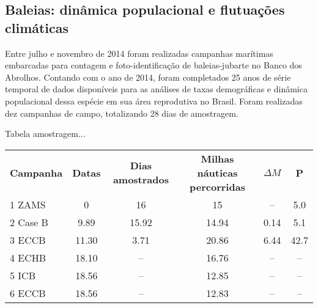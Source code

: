 \subsection{Baleias: dinâmica populacional e flutuações climáticas} %
\label{sec:dinam-popul-de} 

Entre julho e novembro de 2014 foram realizadas campanhas marítimas embarcadas para contagem e foto-identificação de baleias-jubarte no Banco dos Abrolhos. Contando com o ano de 2014, foram completados 25 anos de série temporal de dados disponíveis para as análises de taxas demográficas e dinâmica populacional dessa espécie em sua área reprodutiva no Brasil. Foram realizadas dez campanhas de campo, totalizando 28 dias de amostragem.


Tabela amostragem...
\begin{tabular}{lccccc}
  \textbf{Campanha}        & \textbf{Datas} & \textbf{Dias amostrados}  & \textbf{Milhas náuticas percorridas} &  \textbf{$\Delta M$} & \textbf{P} \\   
    1 ZAMS           & 0      & 16     & 15    & --   & 5.0   \\            
    2 Case B       & 9.89   & 15.92  & 14.94 & 0.14 & 5.1   \\
    3 ECCB        & 11.30  &  3.71  & 20.86 & 6.44 & 42.7  \\
    4 ECHB      & 18.10  & --     & 16.76 &  --  & --    \\
    5 ICB       & 18.56  & --     & 12.85 &  --  & --    \\    
    6 ECCB      & 18.56  & --     & 12.83 &  --  & --    \\
  \end{tabular}